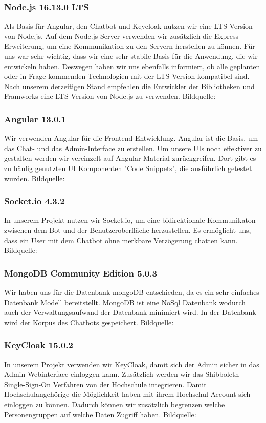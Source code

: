 \subsubsection{Node.js 16.13.0 LTS}
Als Basis für Angular, den Chatbot und Keycloak nutzen wir eine LTS Version von Node.js.
Auf dem Node.js Server verwenden wir zusätzlich die Express Erweiterung,
um eine Kommunikation zu den Servern herstellen zu können.
Für uns war sehr wichtig, dass wir eine sehr stabile Basis für die Anwendung,
die wir entwickeln haben.
Deswegen haben wir uns ebenfalls informiert, ob alle geplanten oder in Frage kommenden Technologien mit der LTS Version kompatibel sind.
Nach unserem derzeitigen Stand empfehlen die Entwickler der Bibliotheken und Framworks eine LTS Version von Node.js zu verwenden.
Bildquelle:\cite{nodejsicon}


\subsubsection{Angular 13.0.1}
Wir verwenden Angular für die Frontend-Entwicklung.
Angular ist die Basis, um das Chat- und das Admin-Interface zu erstellen.
Um unsere UIs noch effektiver zu gestalten werden wir vereinzelt auf Angular Material zurückgreifen.
Dort gibt es zu häufig genutzten UI Komponenten "Code Snippets", die ausführlich getestet wurden.
Bildquelle:\cite{angularicon}

\subsubsection{Socket.io 4.3.2}
In unserem Projekt nutzen wir Socket.io, um eine bidirektionale Kommunikaton zwischen dem Bot und
der Benutzeroberfläche herzustellen.
Es ermöglicht uns, dass ein User mit dem Chatbot ohne merkbare Verzögerung chatten kann.
Bildquelle:\cite{socketioicon}

\subsubsection{MongoDB Community Edition 5.0.3}
Wir haben uns für die Datenbank mongoDB entschieden, da es ein sehr einfaches Datenbank Modell bereitstellt.
MongoDB ist eine NoSql Datenbank wodurch auch der Verwaltungsaufwand der Datenbank minimiert wird.
In der Datenbank wird der Korpus des Chatbots gespeichert.
Bildquelle:\cite{mongodbicon}

\subsubsection{KeyCloak 15.0.2}
In unserem Projekt verwenden wir KeyCloak, damit sich der Admin sicher in das Admin-Webinterface einloggen kann.
Zusätzlich werden wir das Shibboleth Single-Sign-On Verfahren von der Hochschule integrieren.
Damit Hochschulangehörige die Möglichkeit haben mit ihrem Hochschul Account sich einloggen zu können.
Dadurch können wir zusätzlich begrenzen welche Personengruppen auf welche Daten Zugriff haben.
Bildquelle:\cite{keycloakicon}

